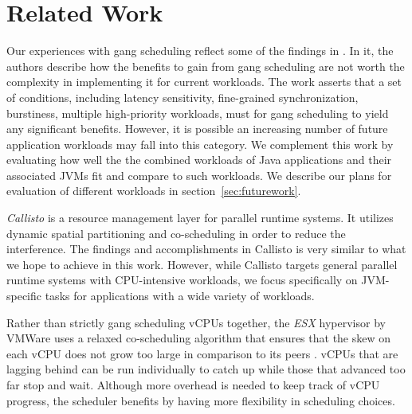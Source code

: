 \documentclass{sig-alternate}
\begin{document}
\section{Related Work} \label{sec:relatedwork}
Our experiences with gang scheduling reflect some of the findings in \cite{peter2011technical}. In it, the authors describe how the benefits to gain from gang scheduling are not worth the complexity in implementing it for current workloads. The work asserts that a set of conditions, including latency sensitivity, fine-grained synchronization, burstiness, multiple high-priority workloads, must for gang scheduling to yield any significant benefits. However, it is possible an increasing number of future application workloads may fall into this category. We complement this work by evaluating how well the the combined workloads of Java applications and their associated JVMs fit and compare to such workloads. We describe our plans for evaluation of different workloads in section~\ref{sec:futurework}.

\textit{Callisto} \cite{harris2014callisto} is a resource management layer for parallel runtime systems. It utilizes dynamic spatial partitioning and co-scheduling in order to reduce the interference. The findings and accomplishments in Callisto is very similar to what we hope to achieve in this work. However, while Callisto targets general parallel runtime systems with CPU-intensive workloads, we focus specifically on JVM-specific tasks for applications with a wide variety of workloads.

Rather than strictly gang scheduling vCPUs together, the \textit{ESX} hypervisor by VMWare  uses a relaxed co-scheduling algorithm that ensures that the skew on each vCPU does not grow too large in comparison to its peers \cite{vmware:whitepaper}. vCPUs that are lagging behind can be run individually to catch up while those that advanced too far stop and wait. Although more overhead is needed to keep track of vCPU progress, the scheduler benefits by having more flexibility in scheduling choices.
\end{document}
